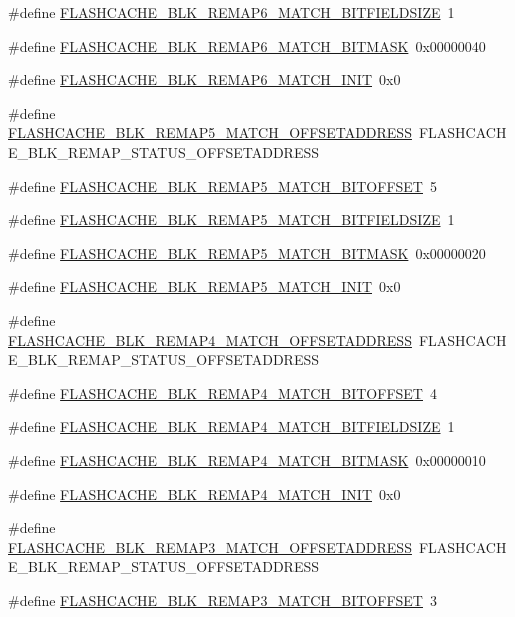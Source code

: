 \begin{DoxyCompactItemize}
\#define \hyperlink{a00550_aecc14b1bc4cc05b872377e874dfff8da}{FLASHCACHE\_\-BLK\_\-REMAP6\_\-MATCH\_\-BITFIELDSIZE}~1
\item 
\#define \hyperlink{a00550_aed6ef19598ac0ac07409ef6e8c6810dd}{FLASHCACHE\_\-BLK\_\-REMAP6\_\-MATCH\_\-BITMASK}~0x00000040
\item 
\#define \hyperlink{a00550_ae97a7bdf7c31183ecd6af58dc93fee81}{FLASHCACHE\_\-BLK\_\-REMAP6\_\-MATCH\_\-INIT}~0x0
\item 
\#define \hyperlink{a00550_a006ca797bf047cc171ca38bc568ee94d}{FLASHCACHE\_\-BLK\_\-REMAP5\_\-MATCH\_\-OFFSETADDRESS}~FLASHCACHE\_\-BLK\_\-REMAP\_\-STATUS\_\-OFFSETADDRESS
\item 
\#define \hyperlink{a00550_a9a30f55be7b6230ab273db9bb5f7ac83}{FLASHCACHE\_\-BLK\_\-REMAP5\_\-MATCH\_\-BITOFFSET}~5
\item 
\#define \hyperlink{a00550_a170aadee1b102e5833ee0d07ece66723}{FLASHCACHE\_\-BLK\_\-REMAP5\_\-MATCH\_\-BITFIELDSIZE}~1
\item 
\#define \hyperlink{a00550_a2aaddfdc508ddb537d7d31fd0ead4bd1}{FLASHCACHE\_\-BLK\_\-REMAP5\_\-MATCH\_\-BITMASK}~0x00000020
\item 
\#define \hyperlink{a00550_a84473b629a99211d937805a7f555fbe1}{FLASHCACHE\_\-BLK\_\-REMAP5\_\-MATCH\_\-INIT}~0x0
\item 
\#define \hyperlink{a00550_a2088e02ce92cc127329ab0f202b1eea2}{FLASHCACHE\_\-BLK\_\-REMAP4\_\-MATCH\_\-OFFSETADDRESS}~FLASHCACHE\_\-BLK\_\-REMAP\_\-STATUS\_\-OFFSETADDRESS
\item 
\#define \hyperlink{a00550_ac17386535bc12e236661fe02da17c30f}{FLASHCACHE\_\-BLK\_\-REMAP4\_\-MATCH\_\-BITOFFSET}~4
\item 
\#define \hyperlink{a00550_afe0b6bff777b62cd16eaf5de2b881073}{FLASHCACHE\_\-BLK\_\-REMAP4\_\-MATCH\_\-BITFIELDSIZE}~1
\item 
\#define \hyperlink{a00550_aee6ea193db52cc556e78c4bff67b8033}{FLASHCACHE\_\-BLK\_\-REMAP4\_\-MATCH\_\-BITMASK}~0x00000010
\item 
\#define \hyperlink{a00550_ab55ec189381c6323eeb045415996031b}{FLASHCACHE\_\-BLK\_\-REMAP4\_\-MATCH\_\-INIT}~0x0
\item 
\#define \hyperlink{a00550_a9eda0f505d8cd17e5963265e63c4ddec}{FLASHCACHE\_\-BLK\_\-REMAP3\_\-MATCH\_\-OFFSETADDRESS}~FLASHCACHE\_\-BLK\_\-REMAP\_\-STATUS\_\-OFFSETADDRESS
\item 
\#define \hyperlink{a00550_a94f6b690de21c622858a2c20576f1d8b}{FLASHCACHE\_\-BLK\_\-REMAP3\_\-MATCH\_\-BITOFFSET}~3
\item 

\end{DoxyCompactItemize}
